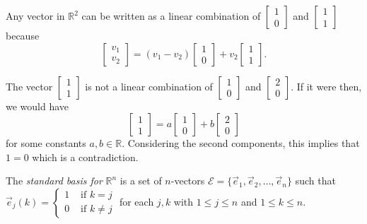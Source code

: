 \begin{example}
Any vector in $\mathbb{R}^2$ can be written as a linear combination of
$\begin{bmatrix}1 \\ 0\end{bmatrix}$ and $\begin{bmatrix}1 \\ 1 \end{bmatrix}$
because
\[
\begin{bmatrix}v_1 \\ v_2\end{bmatrix}=
(v_1-v_2) \begin{bmatrix}1 \\ 0\end{bmatrix}+
v_2 \begin{bmatrix}1 \\ 1 \end{bmatrix}.
\]
\end{example}

\begin{example}
The vector $\begin{bmatrix}1 \\ 1\end{bmatrix}$ is not a linear combination
of $\begin{bmatrix}1 \\ 0\end{bmatrix}$ and $\begin{bmatrix}2 \\
0\end{bmatrix}$. If it were then, we would have
\[
\begin{bmatrix}1 \\ 1\end{bmatrix}=
a \begin{bmatrix}1 \\ 0\end{bmatrix}+
b \begin{bmatrix}2 \\ 0 \end{bmatrix}
\]
for some constants $a,b\in \mathbb{R}$. Considering the second components, this
implies that $1=0$ which is a contradiction.
\end{example}

\begin{definition}
The \emph{standard basis for} $\mathbb{R}^n$ is a set of $n$-vectors
$\mathcal{E}=\{\vec{e}_1, \vec{e}_2, \ldots, \vec{e}_n\}$ such that\\
$\vec{e}_j(k)=\begin{cases}
1 & \text{ if } k=j\\
0 & \text{ if } k\neq j
\end{cases}$
for each $j,k$ with $1\le j \le n$ and $1 \le k \le n$.
\end{definition}


